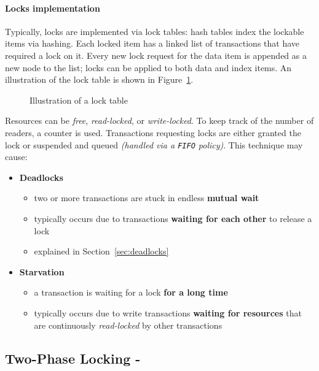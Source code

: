 \documentclass[english]{article}
\begin{document}
\paragraph{Locks implementation}

Typically, locks are implemented via lock tables: hash tables index the lockable items via hashing.
Each locked item has a linked list of transactions that have required a lock on it.
Every new lock request for the data item is appended as a new node to the list;
locks can be applied to both data and index items.
An illustration of the lock table is shown in Figure~\ref{fig:lock-table}.

\begin{figure}[htbp]
  \centering
  \bigskip
  \caption{Illustration of a lock table}
  \label{fig:lock-table}
  \bigskip
\end{figure}

Resources can be \textit{free}, \textit{read-locked}, or \textit{write-locked}.
To keep track of the number of readers, a counter is used.
Transactions requesting locks are either granted the lock or suspended and queued \textit{(handled via a \texttt{FIFO} policy)}.
This technique may cause:

\begin{itemize}
  \item \textbf{Deadlocks}
        \begin{itemize}
          \item two or more transactions are stuck in endless \textbf{mutual wait}
          \item typically occurs due to transactions \textbf{waiting for each other} to release a lock
          \item explained in Section~\ref{sec:deadlocks}
        \end{itemize}
  \item \textbf{Starvation}
        \begin{itemize}
          \item a transaction is waiting for a lock \textbf{for a long time}
          \item typically occurs due to write transactions \textbf{waiting for resources} that are continuously \textit{read-locked} by other transactions
        \end{itemize}
\end{itemize}

\subsection{Two-Phase Locking - \tpl}
\end{document}
